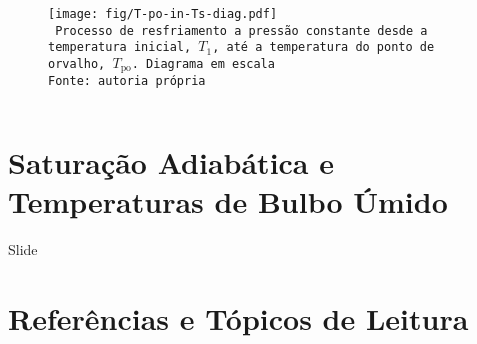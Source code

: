     \begin{frame}\vspace*{-2em}
        \begin{columns}
            \begin{center}
                \begin{figure}
                    \fontsize{5.0}{5}\selectfont
                    \texttt{[image: fig/T-po-in-Ts-diag.pdf]}
                    \\\vspace*{-0.0em}\texttt{%
                        Processo de resfriamento a pressão constante desde a temperatura
                        inicial, $T_1$, até a temperatura do ponto de orvalho,
                        $T_{\mathrm{po}}$. Diagrama em escala \\
                        Fonte: autoria própria
                    }
                \end{figure}
            \end{center}
        \end{columns}
    \end{frame}

\section{Saturação Adiabática e Temperaturas de Bulbo Úmido}

    \begin{frame}{Slide}\vspace*{-2em}
    \end{frame}

\section{Referências e Tópicos de Leitura}

